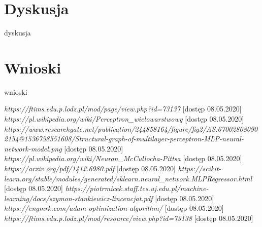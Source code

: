 \documentclass{classrep}
\begin{document}
\section{Dyskusja} %
dyskusja

\section{Wnioski} %
wnioski
\begin{thebibliography}{0}
  	 \textsl{https://ftims.edu.p.lodz.pl/mod/page/view.php?id=73137} [dostęp 08.05.2020]
	 \textsl{https://pl.wikipedia.org/wiki/Perceptron\_wielowarstwowy} [dostęp 08.05.2020]
	 \textsl{https://www.researchgate.net/publication/244858164/figure/fig2/AS:670028080902154@1536758551608/Structural-graph-of-multilayer-perceptron-MLP-neural-network-model.png} [dostęp 08.05.2020]
	 \textsl{https://pl.wikipedia.org/wiki/Neuron\_McCullocha-Pittsa} [dostęp 08.05.2020]
	 \textsl{https://arxiv.org/pdf/1412.6980.pdf} [dostęp 08.05.2020]
	 \textsl{https://scikit-learn.org/stable/modules/generated/sklearn.neural\_network.MLPRegressor.html} [dostęp 08.05.2020]
	 \textsl{https://piotrmicek.staff.tcs.uj.edu.pl/machine-learning/docs/szymon-stankiewicz-lincencjat.pdf} [dostęp 08.05.2020]
	 \textsl{https://engmrk.com/adam-optimization-algorithm/} [dostęp 08.05.2020]
	 \textsl{https://ftims.edu.p.lodz.pl/mod/resource/view.php?id=73138} [dostęp 08.05.2020]
\end{thebibliography}
\end{document}
